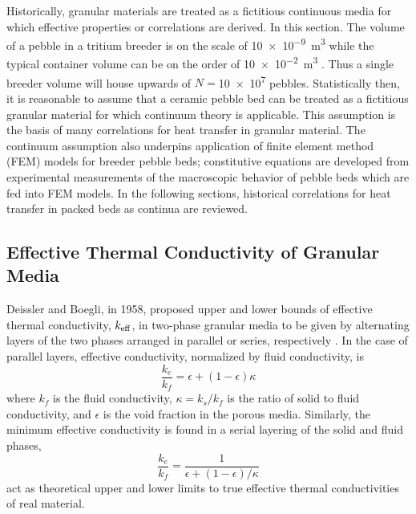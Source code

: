 Historically, granular materials are treated as a fictitious continuous media for which effective properties or correlations are derived. In this section. The volume of a pebble in a tritium breeder is on the scale of \SI{10e-9}{\cubic\meter} while the typical container volume can be on the order of \SI{10e-2}{\cubic\meter} \cite{Cho2008}.  Thus a single breeder volume will house upwards of $N =$\num{10e7} pebbles. Statistically then, it is reasonable to assume that a ceramic pebble bed can be treated as a fictitious granular material for which continuum theory is applicable. This assumption is the basis of many correlations for heat transfer in granular material. The continuum assumption also underpins application of finite element method (FEM) models for breeder pebble beds; constitutive equations are developed from experimental measurements of the macroscopic behavior of pebble beds which are fed into FEM models. In the following sections, historical correlations for heat transfer in packed beds as continua are reviewed.




\subsection{Effective Thermal Conductivity of Granular Media}\label{sec:keff-correlations}


Deissler and Boegli, in 1958, proposed upper and lower bounds of effective thermal conductivity, $k_\text{eff}$, in two-phase granular media to be given by alternating layers of the two phases arranged in parallel or series, respectively \cite{Deissler1958}. In the case of parallel layers, effective conductivity, normalized by fluid conductivity, is
\begin{equation}\label{eq:keff-parallel}
	\frac{k_e}{k_f} = \epsilon + (1-\epsilon)\kappa
\end{equation}
where $k_f$ is the fluid conductivity, $\kappa = k_s/k_f$ is the ratio of solid to fluid conductivity, and $\epsilon$ is the void fraction in the porous media. Similarly, the minimum effective conductivity is found in a serial layering of the solid and fluid phases,
\begin{equation}\label{eq:keff-series}
	\frac{k_e}{k_f} = \frac{1}{\epsilon + (1-\epsilon)/\kappa}
\end{equation}
 act as theoretical upper and lower limits to true effective thermal conductivities of real material. %

